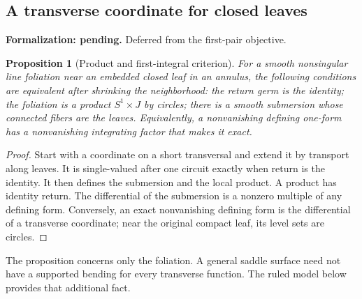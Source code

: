 \documentclass[11pt]{amsart}
\newtheorem{proposition}[theorem]{Proposition}
\theoremstyle{definition}
\theoremstyle{remark}
\numberwithin{equation}{section}
\begin{document}
\subsection{A transverse coordinate for closed leaves}
\par\noindent\textbf{Formalization: pending.} Deferred from the first-pair objective.\par
\begin{proposition}[Product and first-integral criterion]\label{prop:product-holonomy}
For a smooth nonsingular line foliation near an embedded closed leaf in
an annulus, the following conditions are equivalent after shrinking the
neighborhood: the return germ is the identity; the foliation is a product
$S^1\times J$ by circles; there is a smooth submersion whose connected
fibers are the leaves. Equivalently, a nonvanishing defining one-form has
a nonvanishing integrating factor that makes it exact.
\end{proposition}
\begin{proof}
Start with a coordinate on a short transversal and extend it by transport
along leaves. It is single-valued after one circuit exactly when return
is the identity. It then defines the submersion and the local product.
A product has identity return. The differential of the submersion is a
nonzero multiple of any defining form. Conversely, an exact nonvanishing
defining form is the differential of a transverse coordinate; near the
original compact leaf, its level sets are circles.
\end{proof}
The proposition concerns only the foliation. A general saddle surface
need not have a supported bending for every transverse function. The
ruled model below provides that additional fact.
\end{document}

